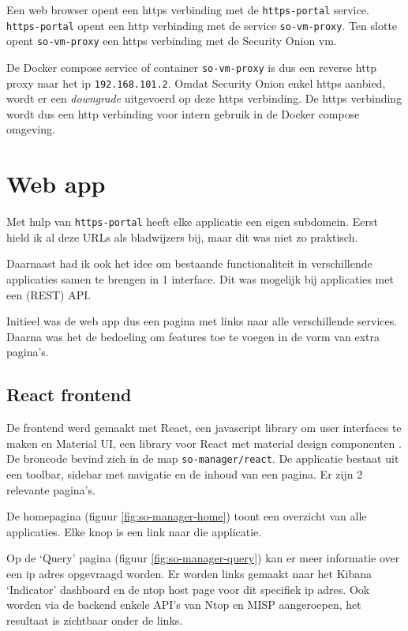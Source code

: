 \documentclass[a4paper, 12pt]{report}
\begin{document}
Een web browser opent een https verbinding met de \lstinline|https-portal| service.
\lstinline|https-portal| opent een http verbinding met de service \lstinline|so-vm-proxy|.
Ten slotte opent \lstinline|so-vm-proxy| een https verbinding met de Security Onion vm.

De Docker compose service of container \lstinline|so-vm-proxy| is dus een reverse http proxy naar het ip \lstinline|192.168.101.2|.
Omdat Security Onion enkel https aanbied, wordt er een \emph{downgrade} uitgevoerd op deze https verbinding.
De https verbinding wordt dus een http verbinding voor intern gebruik in de Docker compose omgeving.

\section{Web app}
Met hulp van \lstinline|https-portal| heeft elke applicatie een eigen subdomein.
Eerst hield ik al deze URLs als bladwijzers bij, maar dit was niet zo praktisch.

Daarnaast had ik ook het idee om bestaande functionaliteit in verschillende applicaties samen te brengen in 1 interface.
Dit was mogelijk bij applicaties met een (REST) API.

Initieel was de web app dus een pagina met links naar alle verschillende services.
Daarna was het de bedoeling om features toe te voegen in de vorm van extra pagina's.

\subsection{React frontend}
\label{sec:so-manager-frontend}
De frontend werd gemaakt met React, een javascript library om user interfaces te maken \autocite{react:home} en Material UI, een library voor React met material design componenten \autocite{material-ui:home}.
De broncode bevind zich in de map \lstinline|so-manager/react|.
De applicatie bestaat uit een toolbar, sidebar met navigatie en de inhoud van een pagina.
Er zijn 2 relevante pagina's.

De homepagina (figuur \ref{fig:so-manager-home}) toont een overzicht van alle applicaties.
Elke knop is een link naar die applicatie.

Op de `Query' pagina (figuur \ref{fig:so-manager-query}) kan er meer informatie over een ip adres opgevraagd worden.
Er worden links gemaakt naar het Kibana `Indicator' dashboard en de ntop host page voor dit specifiek ip adres.
Ook worden via de backend enkele API's van Ntop en MISP aangeroepen, het resultaat is zichtbaar onder de links.
\end{document}

